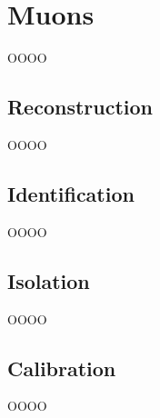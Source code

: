 \section{Muons}
\label{heading:Chapter6-section5-1}

OOOO

\subsection{Reconstruction}
\label{heading:Chapter6-section5-2}

OOOO

\subsection{Identification}
\label{heading:Chapter6-section5-3}

OOOO

\subsection{Isolation}
\label{heading:Chapter6-section5-4}

OOOO

\subsection{Calibration}
\label{heading:Chapter6-section5-5}

OOOO

